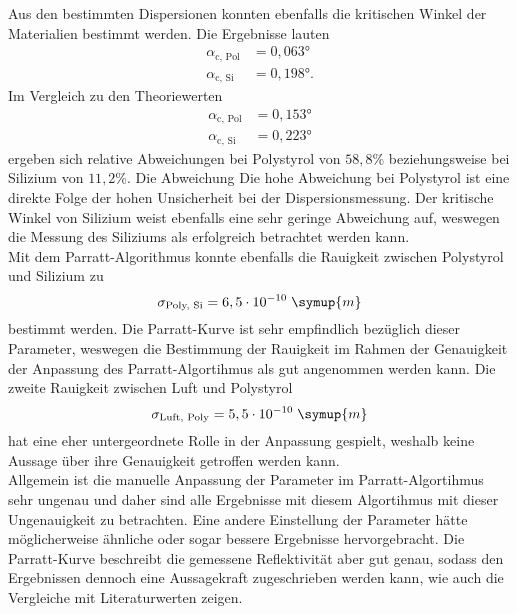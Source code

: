 Aus den bestimmten Dispersionen konnten ebenfalls die kritischen Winkel der Materialien bestimmt
werden. Die Ergebnisse lauten 
\begin{align*}
    \alpha_{\text{c, Pol}} &= 0,063°\\
    \alpha_{\text{c, Si}} &= 0,198°.
\end{align*}
Im Vergleich zu den Theoriewerten \cite{tolan} 
\begin{align*}
    \alpha_{\text{c, Pol}} &= 0,153°\\
    \alpha_{\text{c, Si}} &= 0,223°
\end{align*}
ergeben sich relative Abweichungen bei Polystyrol von $58,8\%$ beziehungsweise bei Silizium von $11,2\%$. Die Abweichung 
Die hohe Abweichung bei Polystyrol ist eine direkte Folge der hohen Unsicherheit bei der Dispersionsmessung.
Der kritische Winkel von Silizium weist ebenfalls eine sehr geringe Abweichung auf, weswegen 
die Messung des Siliziums als erfolgreich betrachtet werden kann.\\
Mit dem Parratt-Algorithmus konnte ebenfalls die Rauigkeit zwischen Polystyrol und 
Silizium zu 
\begin{equation*}
    \sigma_{\text{Poly, Si}} = 6,5 \cdot 10^{-10} \;\symup{m}
\end{equation*}
bestimmt werden. Die Parratt-Kurve ist sehr empfindlich bezüglich dieser Parameter, weswegen 
die Bestimmung der Rauigkeit im Rahmen der Genauigkeit der Anpassung des Parratt-Algortihmus
als gut angenommen werden kann.
Die zweite Rauigkeit zwischen Luft und Polystyrol 
\begin{equation*}
    \sigma_{\text{Luft, Poly}} = 5,5 \cdot 10^{-10} \;\symup{m} 
\end{equation*}
hat eine eher untergeordnete Rolle in der Anpassung gespielt, weshalb keine Aussage über
ihre Genauigkeit getroffen werden kann.\\
Allgemein ist die manuelle Anpassung der Parameter im Parratt-Algortihmus sehr ungenau 
und daher sind alle Ergebnisse mit diesem Algortihmus mit dieser Ungenauigkeit zu betrachten.
Eine andere Einstellung der Parameter hätte möglicherweise ähnliche oder sogar bessere 
Ergebnisse hervorgebracht. Die Parratt-Kurve beschreibt die gemessene Reflektivität
aber gut genau, sodass den Ergebnissen dennoch eine Aussagekraft zugeschrieben werden kann, wie 
auch die Vergleiche mit Literaturwerten zeigen. 
